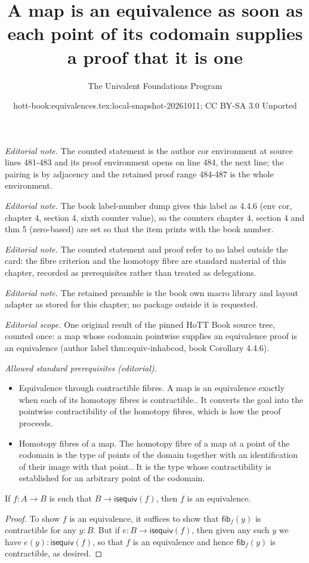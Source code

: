 \documentclass[10pt,a4paper]{article}
\title{A map is an equivalence as soon as each point of its codomain supplies a proof that it is one}
\author{The Univalent Foundations Program}
\date{hott-book:equivalences.tex:local-snapshot-20261011; CC BY-SA 3.0 Unported}
\newcounter{chapter}
\newcommand{\isequiv}{\ensuremath{\mathsf{isequiv}}}
\newcommand{\hfib}[2]{{\mathsf{fib}}_{#1}(#2)}
\theoremstyle{definition}
\theoremstyle{remark}
\numberwithin{equation}{section}
\begin{document}
\maketitle
\setcounter{chapter}{4}
\setcounter{section}{4}
\setcounter{thm}{5}
\noindent\textit{Editorial note.} The counted statement is the author cor environment at source lines 481-483 and its proof environment opens on line 484, the next line; the pairing is by adjacency and the retained proof range 484-487 is the whole environment.\par\medskip
\noindent\textit{Editorial note.} The book label-number dump gives this label as 4.4.6 (env cor, chapter 4, section 4, sixth counter value), so the counters chapter 4, section 4 and thm 5 (zero-based) are set so that the item prints with the book number.\par\medskip
\noindent\textit{Editorial note.} The counted statement and proof refer to no label outside the card: the fibre criterion and the homotopy fibre are standard material of this chapter, recorded as prerequisites rather than treated as delegations.\par\medskip
\noindent\textit{Editorial note.} The retained preamble is the book own macro library and layout adapter as stored for this chapter; no package outside it is requested.\par\medskip
\noindent\textit{Editorial scope.} One original result of the pinned HoTT Book source tree, counted once: a map whose codomain pointwise supplies an equivalence proof is an equivalence (author label thm:equiv-inhabcod, book Corollary 4.4.6).\par\medskip
\noindent\textit{Allowed standard prerequisites (editorial).}\begin{itemize}
\item Equivalence through contractible fibres. A map is an equivalence exactly when each of its homotopy fibres is contractible.. It converts the goal into the pointwise contractibility of the homotopy fibres, which is how the proof proceeds.
\item Homotopy fibres of a map. The homotopy fibre of a map at a point of the codomain is the type of points of the domain together with an identification of their image with that point.. It is the type whose contractibility is established for an arbitrary point of the codomain.
\end{itemize}\medskip
\begin{cor}\label{thm:equiv-inhabcod}
  If $f:A\to B$ is such that $B\to \isequiv(f)$, then $f$ is an equivalence.
\end{cor}

\begin{proof}
  To show $f$ is an equivalence, it suffices to show that $\hfib f y$ is contractible for any $y:B$.
  But if $e:B\to \isequiv(f)$, then given any such $y$ we have $e(y):\isequiv(f)$, so that $f$ is an equivalence and hence $\hfib f y$ is contractible, as desired.
\end{proof}
\end{document}
